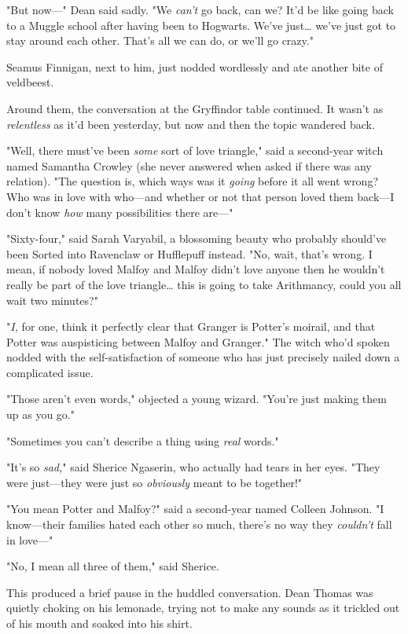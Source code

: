 "But now---" Dean said sadly. "We \emph{can't} go back, can we? It'd be like
going back to a Muggle school after having been to Hogwarts. We've just{\ldots}
we've just got to stay around each other. That's all we can do, or we'll go
crazy."

Seamus Finnigan, next to him, just nodded wordlessly and ate another bite of
veldbeest.

Around them, the conversation at the Gryffindor table continued. It wasn't as
\emph{relentless} as it'd been yesterday, but now and then the topic wandered
back.

"Well, there must've been \emph{some} sort of love triangle," said a
second-year witch named Samantha Crowley (she never answered when asked if
there was any relation). "The question is, which ways was it \emph{going}
before it all went wrong? Who was in love with who---and whether or not that
person loved them back---I don't know \emph{how} many possibilities there
are---"

"Sixty-four," said Sarah Varyabil, a blossoming beauty who probably should've
been Sorted into Ravenclaw or Hufflepuff instead. "No, wait, that's wrong. I
mean, if nobody loved Malfoy and Malfoy didn't love anyone then he wouldn't
really be part of the love triangle{\ldots} this is going to take Arithmancy,
could you all wait two minutes?"

"\emph{I,} for one, think it perfectly clear that Granger is Potter's moirail,
and that Potter was auspisticing between Malfoy and Granger." The witch who'd
spoken nodded with the self-satisfaction of someone who has just precisely
nailed down a complicated issue.

"Those aren't even words," objected a young wizard. "You're just making them up
as you go."

"Sometimes you can't describe a thing using \emph{real} words."

"It's so \emph{sad,}" said Sherice Ngaserin, who actually had tears in her
eyes. "They were just---they were just so \emph{obviously} meant to be
together!"

"You mean Potter and Malfoy?" said a second-year named Colleen Johnson. "I
know---their families hated each other so much, there's no way they
\emph{couldn't} fall in love---"

"No, I mean all three of them," said Sherice.

This produced a brief pause in the huddled conversation. Dean Thomas was
quietly choking on his lemonade, trying not to make any sounds as it trickled
out of his mouth and soaked into his shirt.

